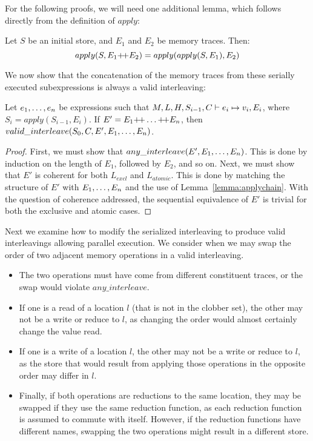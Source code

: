 For the following proofs, we will need one additional lemma, which follows directly
from the definition of $apply$:

\begin{lem}
\label{lemma:applychain}
\rm
Let $S$ be an initial store, and $E_1$ and $E_2$ be memory traces.  Then:
$$apply(S, E_1 \text{+\!+} E_2) = apply(apply(S, E_1), E_2)$$
\end{lem}

We now show that the concatenation of the memory traces from these serially
executed subexpressions is always a valid interleaving:

\begin{thm}
\label{thm:sequential}
\rm
Let ${e}_1,\ldots,{e}_n$ be expressions such that 
$M, L, H, S_{i-1},\linebreak C \vdash e_i \mapsto v_i, E_i$,
where $S_i = apply(S_{i-1}, E_i)$.  If $E' = E_1 \text{+\!+} \ldots \text{+\!+} E_n$, then
$valid\_interleave(S_0, C, E', {E}_1,\ldots,{E}_n)$.
\end{thm}

\begin{proof}
First, we must show that $any\_interleave(E', {E}_1,\ldots,{E}_n)$.  This is done by
induction on the length of $E_1$, followed by $E_2$, and so on.  Next, we must
show that $E'$ is coherent for both $L_{excl}$ and $L_{atomic}$.  This is done by
matching the structure of $E'$ with ${E}_1,\ldots,{E}_n$ and the use of Lemma~\ref{lemma:applychain}.
With the
question of coherence addressed, the sequential equivalence of $E'$ is trivial
for both the exclusive and atomic cases.
\end{proof}

Next we examine how to modify the serialized interleaving to produce valid interleavings allowing parallel execution. 
We consider when we may swap the order of two adjacent memory operations in a valid interleaving.
\begin{itemize}
\item The two operations must have come from different constituent
traces, or the swap would violate $any\_interleave$.
\item If one is a read of
a location $l$ (that is not in the clobber set), the other may not be a write or reduce to $l$, 
as changing the order would almost certainly change the value read.
\item If one is a write of a location $l$, the other may not be a write or reduce to $l$,
as the store that would result from applying those operations in the opposite order may
differ in $l$.
\item Finally, if both operations are reductions to the same location, they may be swapped if they
use the same reduction function, as each reduction function is assumed to commute with itself.  
However, if the reduction functions have different names, swapping the two operations might result in a different store.
\end{itemize}

